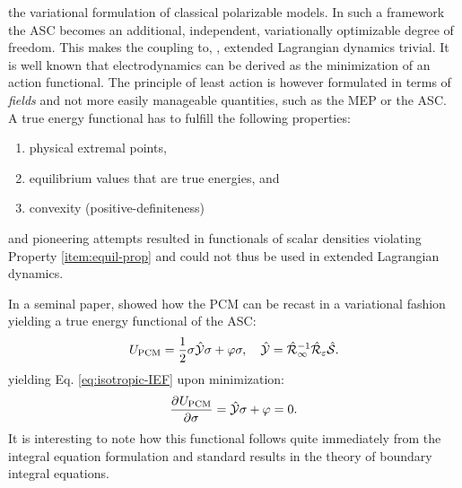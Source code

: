  the
variational formulation of classical polarizable models.
In such a framework the \acrshort{ASC} becomes an additional,
independent, variationally optimizable degree of freedom.
This makes the coupling to, \eg, extended Lagrangian dynamics
trivial.\autocite{Car1985-jw}
It is well known that electrodynamics can be derived as the minimization
of an action functional.\autocite{Jackson1999}
The principle of least action is however formulated in terms of
\emph{fields} and not more easily manageable quantities, such as the
\acrshort{MEP} or the \acrshort{ASC}.
A true energy functional has to fulfill the following
properties:\autocite{Solis2013-ef}
\begin{enumerate}
    \item physical extremal points,
    \item equilibrium values that are true energies, \label{item:equil-prop} and
    \item convexity (positive-definiteness)
\end{enumerate}
\citeauthor{Allen2001-fp} and \citeauthor{Attard2003-vr} pioneering
attempts resulted in functionals of scalar densities violating
Property \ref{item:equil-prop} and could not thus be used in extended Lagrangian
dynamics.\autocite{Allen2001-fp, Attard2003-vr, Attard2007-lk}

In a seminal paper, \citeauthor{Lipparini2010-be} showed how the
\acrshort{PCM} can be recast in a variational fashion yielding a true energy
functional of the \acrshort{ASC}:\autocite{Lipparini2010-be, Lipparini2011-aj, Lipparini2016-mo}
\begin{equation}\label{eq:pcm-functional}
 U_\mathrm{PCM} = \frac{1}{2}\sigma\hat{\mathcal{Y}}\sigma + \varphi\sigma,
 \quad
  \hat{\mathcal{Y}} = \hat{\mathcal{R}}_\infty^{-1}\hat{\mathcal{R}}_\varepsilon\hat{\mathcal{S}}.
\end{equation}
yielding Eq. \eqref{eq:isotropic-IEF} upon minimization:
\begin{equation}\label{eq:pcm-stationarity}
  \frac{\partial^{}U_\mathrm{PCM}} {\partial \sigma^{}} = \hat{\mathcal{Y}}\sigma + \varphi = 0.
\end{equation}
It is interesting to note how this functional follows quite immediately
from the integral equation formulation and standard results in the
theory of boundary integral equations.\autocite{Hsiao2008-xb}

